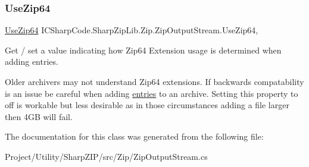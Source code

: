 \subsubsection{\texorpdfstring{Use\+Zip64}{UseZip64}}
{\footnotesize\ttfamily \hyperlink{namespace_i_c_sharp_code_1_1_sharp_zip_lib_1_1_zip_aaa66f18625e7ce19069972caf7bc69a0}{Use\+Zip64} I\+C\+Sharp\+Code.\+Sharp\+Zip\+Lib.\+Zip.\+Zip\+Output\+Stream.\+Use\+Zip64\hspace{0.3cm}{\ttfamily [get]}, {\ttfamily [set]}}



Get / set a value indicating how Zip64 Extension usage is determined when adding entries. 

Older archivers may not understand Zip64 extensions. If backwards compatability is an issue be careful when adding \hyperlink{class_i_c_sharp_code_1_1_sharp_zip_lib_1_1_zip_1_1_zip_entry_a02ebed1814a50d1edc30579332ac74d3}{entries} to an archive. Setting this property to off is workable but less desirable as in those circumstances adding a file larger then 4\+GB will fail.

The documentation for this class was generated from the following file\+:\begin{DoxyCompactItemize}
\item 
Project/\+Utility/\+Sharp\+Z\+I\+P/src/\+Zip/Zip\+Output\+Stream.\+cs\end{DoxyCompactItemize}
